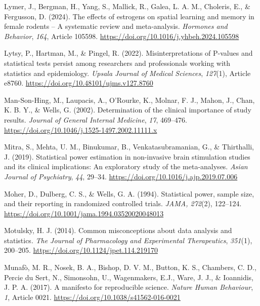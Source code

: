 \documentclass[authordate, meta, issue]{jote-new-article}
\begin{document}
	Lymer, J., Bergman, H., Yang, S., Mallick, R., Galea, L. A. M., Choleris, E., \& Fergusson, D. (2024). The effects of estrogens on spatial learning and memory in female rodents -- A systematic review and meta-analysis. \emph{Hormones and Behavior}, \emph{164}, Article 105598. \url{https://doi.org/10.1016/j.yhbeh.2024.105598}



	Lytsy, P., Hartman, M., \& Pingel, R. (2022). Misinterpretations of P-values and statistical tests persist among researchers and professionals working with statistics and epidemiology. \emph{Upsala Journal of Medical Sciences}, \emph{127}(1), Article e8760. \url{https://doi.org/10.48101/ujms.v127.8760}



	Man-Son-Hing, M., Laupacis, A., O'Rourke, K., Molnar, F. J., Mahon, J., Chan, K. B. Y., \& Wells, G. (2002). Determination of the clinical importance of study results. \emph{Journal of General Internal Medicine}, \emph{17}, 469--476. \url{https://doi.org/10.1046/j.1525-1497.2002.11111.x}



	Mitra, S., Mehta, U. M., Binukumar, B., Venkatasubramanian, G., \& Thirthalli, J. (2019). Statistical power estimation in non-invasive brain stimulation studies and its clinical implications: An exploratory study of the meta-analyses. \emph{Asian Journal of Psychiatry}, \emph{44}, 29--34. \url{https://doi.org/10.1016/j.ajp.2019.07.006}



	Moher, D., Dulberg, C. S., \& Wells, G. A. (1994). Statistical power, sample size, and their reporting in randomized controlled trials. \emph{JAMA, 272}(2), 122--124. \url{https://doi.org/10.1001/jama.1994.03520020048013}



	Motulsky, H. J. (2014). Common misconceptions about data analysis and statistics. \emph{The Journal of Pharmacology and Experimental Therapeutics}, \emph{351}(1), 200--205. \url{https://doi.org/10.1124/jpet.114.219170}



	Munafò, M. R., Nosek, B. A., Bishop, D. V. M., Button, K. S., Chambers, C. D., Percie du Sert, N., Simonsohn, U., Wagenmakers, E.J., Ware, J. J., \& Ioannidis, J. P. A. (2017). A manifesto for reproducible science. \emph{Nature Human Behaviour}, \emph{1}, Article 0021. \url{https://doi.org/10.1038/s41562-016-0021}
\end{document}
